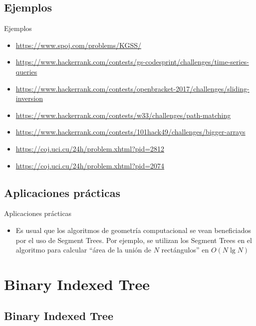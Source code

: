 \documentclass{beamer}
\begin{document}
\subsection{Ejemplos}

\begin{frame}{Ejemplos}
    \begin{itemize}
         \item \url{https://www.spoj.com/problems/KGSS/}
         \item \url{https://www.hackerrank.com/contests/gs-codesprint/challenges/time-series-queries}
         \item \url{https://www.hackerrank.com/contests/openbracket-2017/challenges/sliding-inversion}
         \item \url{https://www.hackerrank.com/contests/w33/challenges/path-matching}
         \item \url{https://www.hackerrank.com/contests/101hack49/challenges/bigger-arrays}
         \item \url{https://coj.uci.cu/24h/problem.xhtml?pid=2812}
         \item \url{https://coj.uci.cu/24h/problem.xhtml?pid=2074}
    \end{itemize}
\end{frame}



\subsection{Aplicaciones prácticas}

\begin{frame}{Aplicaciones prácticas}
    \begin{itemize}
         \item Es usual que los algoritmos de geometría computacional se vean beneficiados por el uso de Segment Trees. Por ejemplo,
                se utilizan los Segment Trees en el algoritmo para calcular ``área de la unión de $N$ rectángulos'' en $O(N \lg N)$
    \end{itemize}
\end{frame}

\section{Binary Indexed Tree} %

\subsection{Binary Indexed Tree} %
\end{document}
